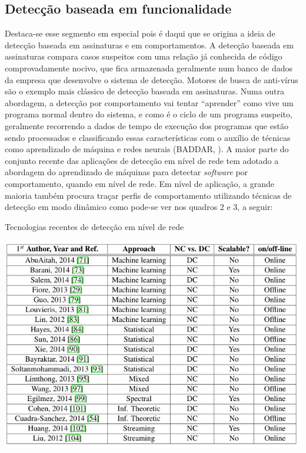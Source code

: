 \subsection{Detecção baseada em funcionalidade}
\label{ss.deteccao_funcionalidade} Destaca-se esse segmento em especial pois é
daqui que se origina a ideia de detecção baseada em assinaturas e em
comportamentos. A detecção baseada em assinaturas compara casos suspeitos com
uma relação já conhecida de código comprovadamente nocivo, que fica armazenada
geralmente num banco de dados da empresa que desenvolve o sistema de detecção.
Motores de busca de anti-vírus são o exemplo mais clássico de detecção baseada
em assinaturas. Numa outra abordagem, a detecção por comportamento vai tentar
``aprender'' como vive um programa normal dentro do sistema, e como é o ciclo
de um programa suspeito, geralmente recorrendo a dados de tempo de execução
dos programas que estão sendo processados e classificando essas
características com o auxílio de técnicas como aprendizado de máquina e redes
neurais (BADDAR, \citeyear{baddarxx}). A maior parte do conjunto recente das aplicações de detecção
em nível de rede tem adotado a abordagem do aprendizado de máquinas para
detectar \textit{software} por comportamento, quando em nível de rede. Em nível de
aplicação, a grande maioria também procura traçar perfis de comportamento
utilizando técnicas de detecção em modo dinâmico como pode-se ver nos quadros
2 e 3, a seguir:

\begin{quadro}[h]
\caption{\small Tecnologias recentes de detecção em nível de rede}
\centering
\includegraphics[scale=0.7]{figs/tabela_deteccao_nivel_rede.JPG}
\label{f.tabeladeteccao_rede}
\end{quadro}

